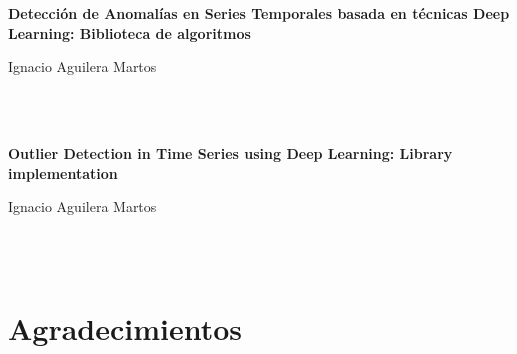 \chapter*{}






\cleardoublepage
\thispagestyle{empty}

\begin{center}
{\large\bfseries Detección de Anomalías en Series Temporales basada en técnicas Deep Learning: Biblioteca de algoritmos}\\
\end{center}
\begin{center}
Ignacio Aguilera Martos\\
\end{center}

\\

\vspace{0.7cm}
\\


\cleardoublepage


\thispagestyle{empty}


\begin{center}
{\large\bfseries Outlier Detection in Time Series using Deep Learning: Library implementation}\\
\end{center}
\begin{center}
Ignacio Aguilera Martos\\
\end{center}

\\

\vspace{0.7cm}
\\


\chapter*{Agradecimientos}
\thispagestyle{empty}

